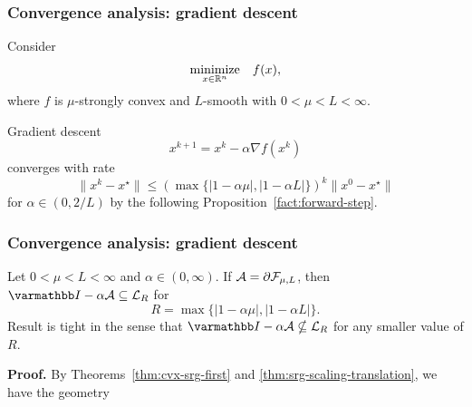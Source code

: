 \documentclass[10pt,mathserif]{beamer}
\begin{document}
\begin{frame}
\frametitle{Convergence analysis: gradient descent}
Consider
\[
\begin{array}{ll}
\underset{x\in \mathbb{R}^n}{\mbox{minimize}}& f(x),
\end{array}
\]
where $f$ is $\mu$-strongly convex and $L$-smooth with $0<\mu<L<\infty$.
\vspace{0.2in}

Gradient descent
\[
x^{k+1}=x^k-\alpha \nabla f(x^k)
\]
converges with rate
\[
\|x^k-x^\star\|\le
\left(\max\{|1-\alpha\mu|,|1-\alpha L|\}\right)^k
\|x^0-x^\star\|
\]
for $\alpha\in (0,2/L)$
by the following Proposition~\ref{fact:forward-step}.
\end{frame}



\begin{frame}[plain]
\frametitle{Convergence analysis: gradient descent}

\setcounter{proposition}{1}

\begin{proposition} \label{fact:forward-step}
Let $0<\mu<L<\infty$ and $\alpha\in (0,\infty)$.
If ${\mathcal{A}}= \partial {\mathcal{F}}_{\mu,L}$, then
$\opI-\alpha\cA\subseteq \cL_R$
for 
\[
R= \max\{|1-\alpha\mu|,|1-\alpha L|\}.
\]
Result is tight in the sense that $\opI-\alpha\cA\nsubseteq \cL_R$ for any smaller value of $R$.
\end{proposition}
\textbf{Proof.}
By Theorems~\ref{thm:cvx-srg-first} and \ref{thm:srg-scaling-translation}, we have the geometry
\begin{center}
\end{center}
\end{frame}
\end{document}
